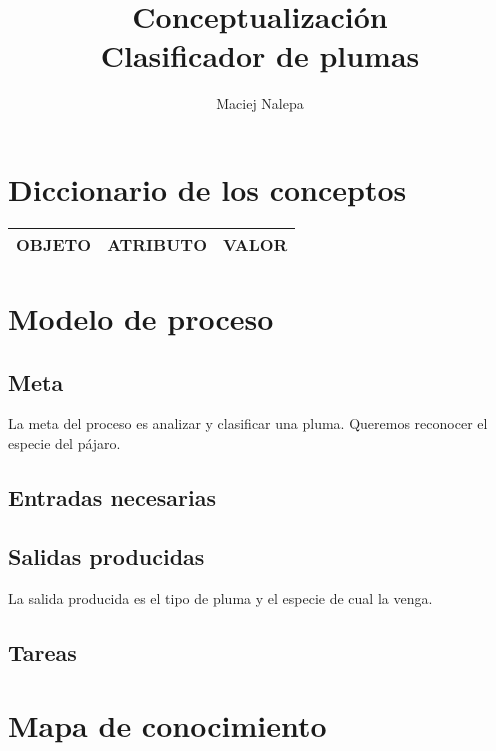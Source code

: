 \documentclass[a4paper,12pt]{article}
\title{Conceptualización\\ \normalsize{Clasificador de plumas}}
\author{Maciej Nalepa}
\begin{document}
\maketitle

\section{Diccionario de los conceptos}
\begin{table}[H]
	\centering
	\begin{tabular}{|l|l|l|}
		\hline
		OBJETO	& ATRIBUTO	& VALOR \\
		\hline
	\end{tabular}
\end{table}

\section{Modelo de proceso}
\subsection{Meta}
La meta del proceso es analizar y clasificar una pluma. Queremos reconocer el especie del pájaro.

\subsection{Entradas necesarias}

\subsection{Salidas producidas}
La salida producida es el tipo de pluma y el especie de cual la venga.

\subsection{Tareas}

\section{Mapa de conocimiento}
\end{document}

